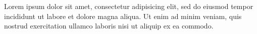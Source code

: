 \documentclass[a4paper, oneside, 12pt, final]{extreport}
\begin{document}
  Lorem ipsum dolor sit amet, consectetur adipisicing elit, sed do eiusmod
  tempor incididunt ut labore et dolore magna aliqua. Ut enim ad minim veniam,
  quis nostrud exercitation ullamco laboris nisi ut aliquip ex ea commodo.


\nocite{*}







%



\cleardoublepage%


\printglossaries
\printindex


\end{document}
